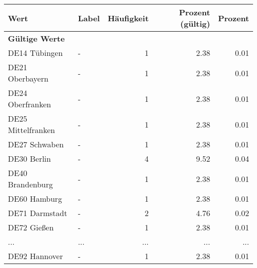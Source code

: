      \begin{longtable}{Xlrrr}
     \toprule
     \textbf{Wert} & \textbf{Label} & \textbf{Häufigkeit} & \textbf{Prozent (gültig)} & \textbf{Prozent} \\
     \endhead
     \midrule
     \multicolumn{5}{l}{\textbf{Gültige Werte}}\\
        \multicolumn{1}{X}{DE14 Tübingen} & - & \num{1} & \num[round-mode=places,round-precision=2]{2.38} & \num[round-mode=places,round-precision=2]{0.01} \\
        \multicolumn{1}{X}{DE21 Oberbayern} & - & \num{1} & \num[round-mode=places,round-precision=2]{2.38} & \num[round-mode=places,round-precision=2]{0.01} \\
        \multicolumn{1}{X}{DE24 Oberfranken} & - & \num{1} & \num[round-mode=places,round-precision=2]{2.38} & \num[round-mode=places,round-precision=2]{0.01} \\
        \multicolumn{1}{X}{DE25 Mittelfranken} & - & \num{1} & \num[round-mode=places,round-precision=2]{2.38} & \num[round-mode=places,round-precision=2]{0.01} \\
        \multicolumn{1}{X}{DE27 Schwaben} & - & \num{1} & \num[round-mode=places,round-precision=2]{2.38} & \num[round-mode=places,round-precision=2]{0.01} \\
        \multicolumn{1}{X}{DE30 Berlin} & - & \num{4} & \num[round-mode=places,round-precision=2]{9.52} & \num[round-mode=places,round-precision=2]{0.04} \\
        \multicolumn{1}{X}{DE40 Brandenburg} & - & \num{1} & \num[round-mode=places,round-precision=2]{2.38} & \num[round-mode=places,round-precision=2]{0.01} \\
        \multicolumn{1}{X}{DE60 Hamburg} & - & \num{1} & \num[round-mode=places,round-precision=2]{2.38} & \num[round-mode=places,round-precision=2]{0.01} \\
        \multicolumn{1}{X}{DE71 Darmstadt} & - & \num{2} & \num[round-mode=places,round-precision=2]{4.76} & \num[round-mode=places,round-precision=2]{0.02} \\
        \multicolumn{1}{X}{DE72 Gießen} & - & \num{1} & \num[round-mode=places,round-precision=2]{2.38} & \num[round-mode=places,round-precision=2]{0.01} \\
       ... & ... & ... & ... & ... \\
        \multicolumn{1}{X}{DE92 Hannover} & - & \num{1} & \num[round-mode=places,round-precision=2]{2.38} & \num[round-mode=places,round-precision=2]{0.01} \\

\end{longtable}
